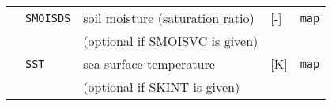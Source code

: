 {\begin{table}[bth]
\begin{center}
\begin{tabularx}{150mm}{rl|l|l|l}
           &\verb|SMOISDS| & soil moisture (saturation ratio) & [-]            & \verb|map|         \\
           &               & (optional if SMOISVC is given)   &                &                    \\
           &\verb|SST|     & sea surface temperature          & [K]            & \verb|map|         \\
           &               & (optional if SKINT is given)     &                &                    \\\hline
\end{tabularx}
\end{center}
\end{table}
}
